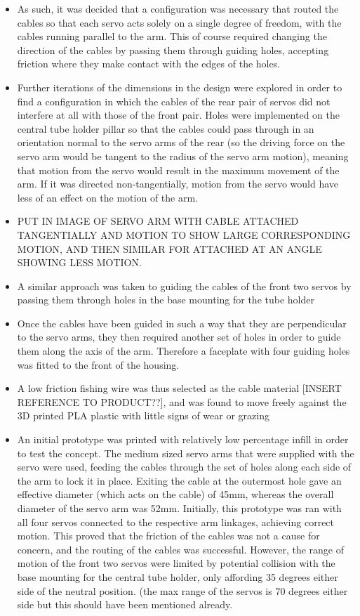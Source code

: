\documentclass[11pt]{article}
\begin{document}
\begin{itemize}
\item{As such, it was decided that a configuration was necessary that routed the cables so that each servo acts solely on a single degree of freedom, with the cables running parallel to the arm. This of course required changing the direction of the cables by passing them through guiding holes, accepting friction where they make contact with the edges of the holes.}
\item{Further iterations of the dimensions in the design were explored in order to find a configuration in which the cables of the rear pair of servos did not interfere at all with those of the front pair. Holes were implemented on the central tube holder pillar so that the cables could pass through in an orientation normal to the servo arms of the rear (so the driving force on the servo arm would be tangent to the radius  of the servo arm motion), meaning that motion from the servo would result in the maximum movement of the arm. If it was directed non-tangentially, motion from the servo would have less of an effect on the motion of the arm.} 
\item{PUT IN IMAGE OF SERVO ARM WITH CABLE ATTACHED TANGENTIALLY AND MOTION TO SHOW LARGE CORRESPONDING MOTION, AND THEN SIMILAR FOR ATTACHED AT AN ANGLE SHOWING LESS MOTION.}
\item{A similar approach was taken to guiding the cables of the front two servos by passing them through holes in the base mounting for the tube holder }
\item{Once the cables have been guided in such a way that they are perpendicular to the servo arms, they then required another set of holes in order to guide them along the axis of the arm. Therefore a faceplate with four guiding holes was fitted to the front of the housing.}
\item{A low friction fishing wire was thus selected as the cable material [INSERT REFERENCE TO PRODUCT??], and was found to move freely against the 3D printed PLA plastic with little signs of wear or grazing}
\item{An initial prototype was printed with relatively low percentage infill in order to test the concept. The medium sized servo arms that were supplied with the servo were used, feeding the cables through the set of holes along each side of the arm to lock it in place. Exiting the cable at the outermost hole gave an effective diameter (which acts on the cable) of 45mm, whereas the overall diameter of the servo arm was 52mm. Initially, this prototype was ran with all four servos connected to the respective arm linkages, achieving correct motion. This proved that the friction of the cables was not a cause for concern, and the routing of the cables was successful. However, the range of motion of the front two servos were limited by potential collision with the base mounting for the central tube holder, only affording 35 degrees either side of the neutral position. (the max range of the servos is 70 degrees either side but this should have been mentioned already.}

\end{itemize}
\end{document}
